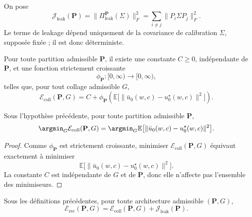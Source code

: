 \begin{definition}
On pose
\[
\mathcal J_{\mathrm{leak}}(\mathbf P)
=
\bigl\|\Pi_{\mathrm{leak}}^{\mathbf P}(\Sigma)\bigr\|_F^2
=
\sum_{i\neq j}\|P_i\Sigma P_j\|_F^2.
\]
Le terme de leakage dépend uniquement de la covariance de calibration \(\Sigma\), supposée fixée ; il est donc déterministe.
\end{definition}

\begin{assumption}
Pour toute partition admissible \(\mathbf P\), il existe une constante \(C\ge 0\), indépendante de \(\mathbf P\), et une fonction strictement croissante
\[
\phi_{\mathbf P}:[0,\infty)\to[0,\infty),
\]
telles que, pour tout collage admissible \(G\),
\[
\mathcal E_{\mathrm{coll}}(\mathbf P,G)
=
C
+
\phi_{\mathbf P}\!\left(\mathbb E\bigl[\|\bar u_0(w,c)-u_0^\star(w,c)\|^2\bigr]\right).
\]
\end{assumption}

\begin{proposition}
Sous l'hypothèse précédente, pour toute partition admissible \(\mathbf P\),
\[
\argmin_G \mathcal E_{\mathrm{coll}}(\mathbf P,G)
=
\argmin_G \mathbb E\bigl[\|\bar u_0(w,c)-u_0^\star(w,c)\|^2\bigr].
\]
\end{proposition}

\begin{proof}
Comme \(\phi_{\mathbf P}\) est strictement croissante, minimiser \(\mathcal E_{\mathrm{coll}}(\mathbf P,G)\) équivaut exactement à minimiser
\[
\mathbb E\bigl[\|\bar u_0(w,c)-u_0^\star(w,c)\|^2\bigr].
\]
La constante \(C\) est indépendante de \(G\) et de \(\mathbf P\), donc elle n'affecte pas l'ensemble des minimiseurs.
\end{proof}

\begin{theorem}
Sous les définitions précédentes, pour toute architecture admissible \((\mathbf P,G)\),
\[
\mathcal E_{\mathrm{rec}}(\mathbf P,G)
=
\mathcal E_{\mathrm{coll}}(\mathbf P,G)
+
\mathcal J_{\mathrm{leak}}(\mathbf P).
\]
\end{theorem}

